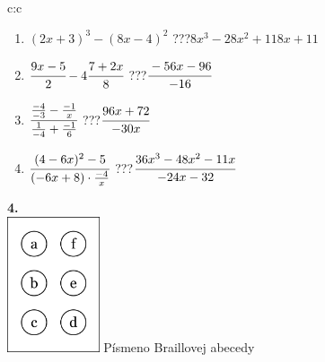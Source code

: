 \documentclass[10pt]{report}
\begin{document}
\begin{tabular}{c:c}
\begin{minipage}[c][104.5mm][t]{0.5\linewidth}
\begin{center}
\begin{minipage}{0.79\linewidth}
\begin{center}
\begin{varwidth}{\linewidth}
\begin{enumerate}
\item $(2x+3)^3-(8x-4)^2$\quad \dotfill\; ???\;\dotfill \quad $8x^3-28x^2+118x+11$
\item $\cfrac{9x-5}{2}-4\cfrac{7+2x}{8}$\quad \dotfill\; ???\;\dotfill \quad $\cfrac{-56x-96}{-16}$
\item $\cfrac{\frac{-4}{-3}-\frac{-1}{x}}{\frac{1}{-4}+\frac{-1}{6}}$\quad \dotfill\; ???\;\dotfill \quad $\cfrac{96x+72}{-30x}$
\item $\cfrac{(4-6x)^2-5}{(-6x+8)\cdot\frac{-4}{x}}$\quad \dotfill\; ???\;\dotfill \quad $\cfrac{36x^3-48x^2-11x}{-24x-32}$
\end{enumerate}
\end{varwidth}
\end{center}
\end{minipage}
\begin{minipage}{0.20\linewidth}
\begin{center}
{\Huge\bfseries 4.} \\[2mm]
\includegraphics[height=40mm]{../images/braille.png}
{\small Písmeno Braillovej abecedy}
\end{center}
\end{minipage}
\end{center}
\end{minipage}
%
\end{tabular}
\newpage
\thispagestyle{empty}
\end{document}
